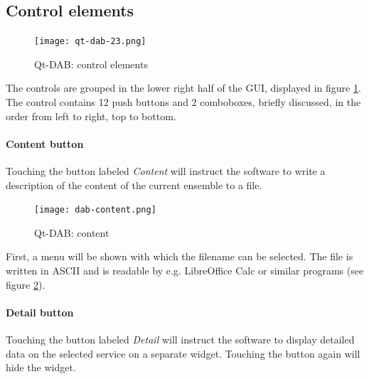 \documentclass[12pt]{article}
\begin{document}
\subsection{Control elements}
\begin{figure}[htp]
\centering
\texttt{[image: qt-dab-23.png]}
\caption{Qt-DAB: control elements}
\label{figure:control-elements}
\end{figure}

The controls are grouped in the lower right half of the GUI, displayed in
figure \ref{figure:control-elements}.
The control contains 12 push buttons and 2 comboboxes,
briefly discussed, in the order from left
to right, top to bottom.
\paragraph{Content button}
Touching the button labeled {\em Content} will instruct the software
to write a description of the content of the current ensemble to a file.
\begin{figure}[htp]
\centering
\texttt{[image: dab-content.png]}
\caption{Qt-DAB: content}
\label{figure:content}
\end{figure}
First, a menu will be shown with which
the filename can be selected. The file is written in ASCII and is readable
by e.g. LibreOffice Calc or similar programs (see figure \ref{figure:content}).
\paragraph{Detail button}
Touching the button labeled {\em Detail} will instruct the software
to display detailed data on the selected service on a separate widget.
Touching the button again will hide the widget.
\end{document}
